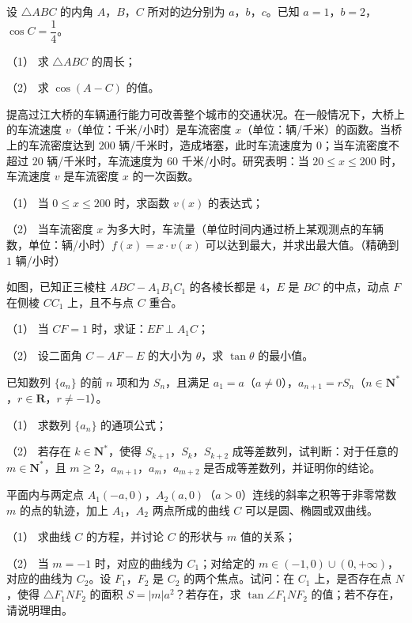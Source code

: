 \begin{question}
设 $\triangle ABC$ 的内角 $A$，$B$，$C$ 所对的边分别为 $a$，$b$，$c$。已知 $a=1$，$b=2$，$\cos C=\dfrac14$。

（1） 求 $\triangle ABC$ 的周长；

（2） 求 $\cos(A-C)$ 的值。

\end{question}
\begin{question}
提高过江大桥的车辆通行能力可改善整个城市的交通状况。在一般情况下，大桥上的车流速度 $v$（单位：千米/小时）是车流密度 $x$（单位：辆/千米）的函数。当桥上的车流密度达到 $200$ 辆/千米时，造成堵塞，此时车流速度为 $0$；当车流密度不超过 $20$ 辆/千米时，车流速度为 $60$ 千米/小时。研究表明：当 $20\leqslant x\leqslant200$ 时，车流速度 $v$ 是车流密度 $x$ 的一次函数。

（1） 当 $0\leqslant x\leqslant200$ 时，求函数 $v(x)$ 的表达式；

（2） 当车流密度 $x$ 为多大时，车流量（单位时间内通过桥上某观测点的车辆数，单位：辆/小时）$f(x)=x\cdot v(x)$ 可以达到最大，并求出最大值。（精确到 $1$ 辆/小时）

\Needspace{0.4\textheight}
\end{question}
\begin{question}
如图，已知正三棱柱 $ABC-A_1B_1C_1$ 的各棱长都是 $4$，$E$ 是 $BC$ 的中点，动点 $F$ 在侧棱 $CC_1$ 上，且不与点 $C$ 重合。

（1） 当 $CF=1$ 时，求证：$EF\perp A_1C$；

（2） 设二面角 $C-AF-E$ 的大小为 $\theta$，求 $\tan\theta$ 的最小值。
\nopagebreak[4]
\begin{center}\end{center}
\nopagebreak[4]
\end{question}
\begin{question}
已知数列 $\{a_n\}$ 的前 $n$ 项和为 $S_n$，且满足 $a_1=a$（$a\neq0$），$a_{n+1}=rS_n$（$n\in\mathbf N^*$，$r\in\mathbf R$，$r\neq-1$）。

（1） 求数列 $\{a_n\}$ 的通项公式；

（2） 若存在 $k\in\mathbf N^*$，使得 $S_{k+1}$，$S_k$，$S_{k+2}$ 成等差数列，试判断：对于任意的 $m\in\mathbf N^*$，且 $m\geqslant2$，$a_{m+1}$，$a_m$，$a_{m+2}$ 是否成等差数列，并证明你的结论。

\end{question}
\begin{question}
平面内与两定点 $A_1(-a,0)$，$A_2(a,0)$（$a>0$）连线的斜率之积等于非零常数 $m$ 的点的轨迹，加上 $A_1$，$A_2$ 两点所成的曲线 $C$ 可以是圆、椭圆或双曲线。

（1） 求曲线 $C$ 的方程，并讨论 $C$ 的形状与 $m$ 值的关系；

（2） 当 $m=-1$ 时，对应的曲线为 $C_1$；对给定的 $m\in(-1,0)\cup(0,+\infty)$，对应的曲线为 $C_2$。设 $F_1$，$F_2$ 是 $C_2$ 的两个焦点。试问：在 $C_1$ 上，是否存在点 $N$，使得 $\triangle F_1NF_2$ 的面积 $S=|m|a^2$？若存在，求 $\tan\angle F_1NF_2$ 的值；若不存在，请说明理由。

\end{question}
